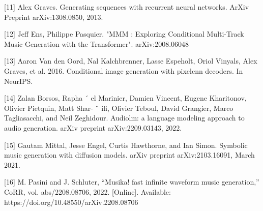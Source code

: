 \documentclass{article}
\begin{document}
{[11] Alex Graves. Generating sequences with recurrent neural networks. ArXiv Preprint arXiv:1308.0850, 2013.

[12] Jeff Ens, Philippe Pasquier. "MMM : Exploring Conditional Multi-Track Music Generation with the Transformer". 	arXiv:2008.06048

[13] Aaron Van den Oord, Nal Kalchbrenner, Lasse Espeholt, Oriol Vinyals, Alex Graves, et al. 2016. Conditional image generation with pixelcnn decoders. In NeurIPS.

[14] Zalan Borsos, Rapha ´ el Marinier, Damien Vincent, Eugene Kharitonov, Olivier Pietquin, Matt Shar- ¨
ifi, Olivier Teboul, David Grangier, Marco Tagliasacchi, and Neil Zeghidour. Audiolm: a language modeling approach to audio generation. arXiv preprint arXiv:2209.03143, 2022.

[15] Gautam Mittal, Jesse Engel, Curtis Hawthorne, and Ian Simon. Symbolic music generation
with diffusion models. arXiv preprint arXiv:2103.16091, March 2021.

[16] M. Pasini and J. Schluter, “Musika! fast infinite waveform music generation,” CoRR, vol. abs/2208.08706, 2022. [Online]. Available:
https://doi.org/10.48550/arXiv.2208.08706



}
\end{document}
